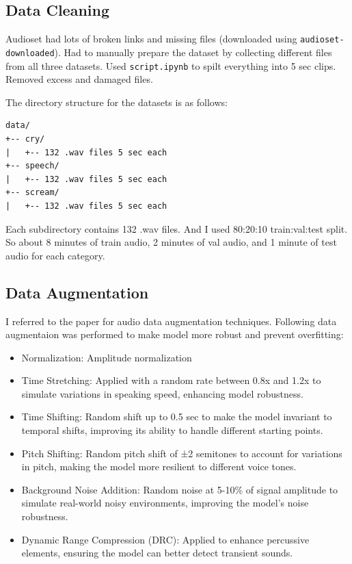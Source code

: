 \documentclass[conference]{IEEEtran}
\begin{document}
\subsection{Data Cleaning}
Audioset had lots of broken links and missing files (downloaded using \texttt{audioset-downloaded}). Had to manually prepare the dataset by collecting different files from all three datasets. Used \texttt{script.ipynb} to spilt everything into 5 sec clips. Removed excess and damaged files.

The directory structure for the datasets is as follows:
\begin{verbatim}
data/
+-- cry/
|   +-- 132 .wav files 5 sec each
+-- speech/
|   +-- 132 .wav files 5 sec each
+-- scream/
|   +-- 132 .wav files 5 sec each
\end{verbatim}
Each subdirectory contains 132 .wav files. And I used 80:20:10 train:val:test split. So about 8 minutes of train audio, 2 minutes of val audio, and 1 minute of test audio for each category.

\subsection{Data Augmentation}
I referred to the paper \cite{data-augmentation} for audio data augmentation techniques. Following data augmentaion was performed to make model more robust and prevent overfitting:
\begin{itemize}
\item Normalization: Amplitude normalization
\item Time Stretching: Applied with a random rate between 0.8x and 1.2x to simulate variations in speaking speed, enhancing model robustness.
\item Time Shifting: Random shift up to 0.5 sec to make the model invariant to temporal shifts, improving its ability to handle different starting points.
\item Pitch Shifting: Random pitch shift of ±2 semitones to account for variations in pitch, making the model more resilient to different voice tones.
\item Background Noise Addition: Random noise at 5-10\% of signal amplitude to simulate real-world noisy environments, improving the model's noise robustness.
\item Dynamic Range Compression (DRC): Applied to enhance percussive elements, ensuring the model can better detect transient sounds.
\end{itemize}
\end{document}
